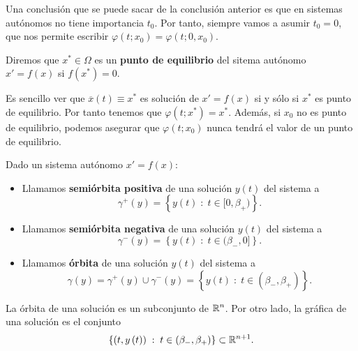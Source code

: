 \begin{observation}
Una conclusión que se puede sacar de la conclusión anterior es que en sistemas autónomos no tiene importancia $\displaystyle t_{0} $. Por tanto, siempre vamos a asumir $\displaystyle t_{0}=0 $, que nos permite escribir $\displaystyle \varphi\left(t; x_{0}\right) = \varphi\left(t; 0, x_{0}\right) $.
\end{observation}
\begin{definition}
Diremos que $\displaystyle x^{*}\in \Omega  $ es un \textbf{punto de equilibrio} del sitema autónomo $\displaystyle x' = f\left(x\right) $ si $\displaystyle f\left(x^{*}\right)=0 $.
\end{definition}
\begin{observation}
Es sencillo ver que $\displaystyle \overline{x}\left(t\right)\equiv x^{*} $ es solución de $\displaystyle x' =f\left(x\right) $ si y sólo si $\displaystyle x^{*} $ es punto de equilibrio. Por tanto tenemos que $\displaystyle \varphi\left(t; x^{*}\right)=x^{*} $. Además, si $\displaystyle x_{0} $ no es punto de equilibrio, podemos asegurar que $\displaystyle \varphi\left(t; x_{0}\right) $ nunca tendrá el valor de un punto de equilibrio.
\end{observation}
\begin{definition}
Dado un sistema autónomo $\displaystyle x ' = f\left(x\right) $:
\begin{itemize}
\item Llamamos \textbf{semiórbita positiva} de una solución $\displaystyle y\left(t\right) $ del sistema a 
	\[\gamma^{+ }\left(y\right)= \left\{ y\left(t\right)\; : \; t \in [0, \beta_{+})\right\}  .\]
\item Llamamos \textbf{semiórbita negativa} de una solución $\displaystyle y\left(t\right) $ del sistema a
	\[\gamma^{-}\left(y\right) = \left\{ y\left(t\right) \; : \; t \in (\beta_{-}, 0]\right\}  .\]
\item Llamamos \textbf{órbita} de una solución $\displaystyle y\left(t\right) $ del sistema a 
	\[\gamma\left(y\right)=\gamma^{+}\left(y\right)\cup \gamma^{-}\left(y\right) = \left\{ y\left(t\right)\; : \; t \in \left(\beta_{-}, \beta_{+ }\right)\right\}  .\]
\end{itemize}
\end{definition}
\begin{observation}
	La órbita de una solución es un subconjunto de $\displaystyle \mathbb{R}^{n} $. Por otro lado, la gráfica de una solución es el conjunto 
	\[\left\{ \left(t,y\left(t\right)\right)\; : \; t \in \left(\beta_{-}, \beta_{+ }\right)\right\} \subset \mathbb{R}^{n+1} .\]
\end{observation}
